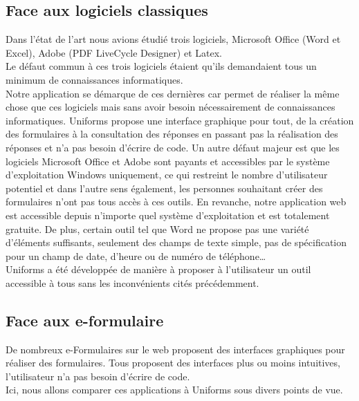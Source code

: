 \documentclass{sigplanconf}
\begin{document}
\subsection{Face aux logiciels classiques}
Dans l’état de l’art nous avions étudié trois logiciels,  Microsoft Office (Word et Excel), Adobe (PDF LiveCycle Designer) et Latex.\\
Le défaut commun à ces trois logiciels étaient qu’ils demandaient tous un minimum de connaissances informatiques.\\
Notre application se démarque de ces dernières car permet de réaliser la même chose que ces logiciels mais sans avoir besoin nécessairement de connaissances informatiques. Uniforms propose une interface graphique pour tout, de la création des formulaires à la consultation des réponses en passant pas la réalisation des réponses et n’a pas besoin d’écrire de code.
Un autre défaut majeur est que les logiciels Microsoft Office et Adobe sont payants et accessibles par le système d’exploitation Windows uniquement, ce qui restreint le nombre d’utilisateur potentiel et dans l’autre sens également, les personnes souhaitant créer des formulaires n’ont pas tous accès à ces outils. En revanche, notre application web est accessible depuis n’importe quel système d’exploitation et est totalement gratuite.
De plus, certain outil tel que Word ne propose pas une variété d’éléments suffisants, seulement des champs de texte simple, pas de spécification pour un champ de date, d’heure ou de numéro de téléphone…\\
Uniforms a été développée de manière à proposer à l’utilisateur un outil accessible à tous sans les inconvénients cités précédemment.

\subsection{Face aux e-formulaire}
De nombreux e-Formulaires sur le web proposent des interfaces graphiques pour réaliser des formulaires. Tous proposent des interfaces plus ou moins intuitives, l’utilisateur n’a pas besoin d’écrire de code. \\
Ici, nous allons comparer ces applications à Uniforms sous divers points de vue.
\end{document}
